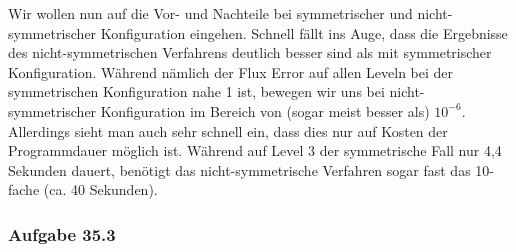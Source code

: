\begin{figure}[H]
	\centering
\end{figure}


\begin{figure}[H]
	\centering
\end{figure}

Wir wollen nun auf die Vor- und Nachteile bei symmetrischer und nicht-symmetrischer Konfiguration eingehen.
Schnell fällt ins Auge, dass die Ergebnisse des nicht-symmetrischen Verfahrens deutlich besser sind als mit symmetrischer Konfiguration. Während nämlich der Flux Error auf allen Leveln bei der symmetrischen Konfiguration nahe 1 ist, bewegen wir uns bei nicht-symmetrischer Konfiguration im Bereich von (sogar meist besser als) $10^{-6}$. Allerdings sieht man auch sehr schnell ein, dass dies nur auf Kosten der Programmdauer möglich ist. Während auf Level 3 der symmetrische Fall nur 4,4 Sekunden dauert, benötigt das nicht-symmetrische Verfahren sogar fast das 10-fache (ca. 40 Sekunden). 

\subsubsection{Aufgabe 35.3}
\begin{figure}[H]
	\centering
\end{figure}

